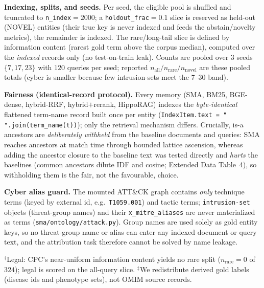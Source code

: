 \documentclass[pdflatex,sn-nature]{sn-jnl}
\begin{document}
\begin{appendices}
\begin{table}[htbp]
\begin{flushleft}
{\textbf{Indexing, splits, and seeds.} Per seed, the eligible pool is shuffled and
truncated to \texttt{n\_index}$=2000$; a \texttt{holdout\_frac}$=0.1$ slice is
reserved as held-out (NOVEL) entities (their true key is never indexed and feeds
the abstain/novelty metrics), the remainder is indexed. The rare/long-tail slice
is defined by information content (rarest gold term above the corpus median),
computed over the \emph{indexed} records only (no test-on-train leak). Counts are
pooled over $3$ seeds $\{7,17,23\}$ with $120$ queries per seed; reported
$n_\text{all}/n_\text{rare}/n_\text{novel}$ are these pooled totals (cyber is
smaller because few intrusion-sets meet the 7--30 band).

\textbf{Fairness (identical-record protocol).} Every memory (SMA, BM25,
BGE-dense, hybrid-RRF, hybrid$+$rerank, HippoRAG) indexes the \emph{byte-identical}
flattened term-name record built once per entity
(\texttt{IndexItem.text = " ".join(term\_name(t))}); only the retrieval mechanism
differs. Crucially, is-a ancestors are \emph{deliberately withheld} from the
baseline documents and queries: SMA reaches ancestors at match time through
bounded lattice ascension, whereas adding the ancestor closure to the baseline
text was tested directly and \emph{hurts} the baselines (common ancestors dilute
IDF and cosine; Extended Data Table~4), so withholding them
is the fair, not the favourable, choice.

\textbf{Cyber alias guard.} The mounted ATT\&CK graph contains \emph{only}
technique terms (keyed by external id, e.g.\ \texttt{T1059.001}) and tactic terms;
\texttt{intrusion-set} objects (threat-group names) and their
\texttt{x\_mitre\_aliases} are never materialized as terms
(\texttt{sma/ontology/attack.py}). Group names are used solely as gold entity
keys, so no threat-group name or alias can enter any indexed document or query
text, and the attribution task therefore cannot be solved by name leakage.

$^{\dagger}$Legal: CPC's near-uniform information content yields no rare split
($n_\text{rare}=0$ of $324$); legal is scored on the all-query slice.
$^{\ddagger}$We redistribute derived gold labels (disease ids and phenotype
sets), not OMIM source records.}
\end{flushleft}
\label{tab:ed6_datasheet}
\end{table}




\end{appendices}
\end{document}
